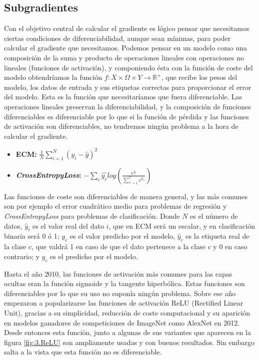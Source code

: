 \subsection{Subgradientes} \label{sec:subgrad}

Con el objetivo central de calcular el gradiente es lógico pensar que necesitamos ciertas condiciones de diferenciabilidad, aunque sean mínimas, para poder calcular el gradiente que necesitamos. Podemos pensar en un modelo como una composición de la suma y producto de operaciones lineales con operaciones no lineales (funciones de activación), y componiendo ésta con la función de coste del modelo obtendríamos la función $f: X \times \Omega \times Y \rightarrow \mathbb{R^+}$, que recibe los pesos del modelo, los datos de entrada y sus etiquetas correctas para proporcionar el error del modelo. Esta es la función que necesitaríamos que fuera diferenciable. Las operaciones lineales preservan la diferenciabilidad, y la composición de funciones diferenciables es diferenciable por lo que si la función de pérdida y las funciones de activación son diferenciables, no tendremos ningún problema a la hora de calcular el gradiente.

\begin{itemize}
    \item \textbf{ECM:} $\frac{1}{N} \sum_{i=1}^N \left (y_i - \hat{y} \right ) ^2$ 

    \item \textbf{\textit{CrossEntropyLoss}:} $  - \sum_c \hat{y_c} log(\frac{e^{y_c}}{\sum_{c'=1}^C e^{y_{c'}}})$
\end{itemize}

Las funciones de coste son diferenciables de manera general, y las más comunes son por ejemplo el error cuadrático medio para problemas de regresión y \textit{CrossEntropyLoss} para problemas de clasificación. Donde $N$ es el número de datos, $\hat{y}_i$ es el valor real del dato $i$, que en ECM será un escalar, y en clasificación binaria será 0 ó 1; $y_c$ es el valor predicho por el modelo, $\hat{y}_{c}$ es la etiqueta real de la clase $c$, que valdrá 1 en caso de que el dato pertenece a la clase $c$ y 0 en caso contrario; y $y_{c}$ es el predicho por el modelo. 


Hasta el año 2010, las funciones de activación más comunes para las capas ocultas eran la función sigmoide y la tangente hiperbólica. Estas funciones son diferenciables por lo que su uso no suponía ningún problema. Sobre ese año empezaron a popularizarse las funciones de activación ReLU (Rectified Linear Unit), gracias a su simplicidad, reducción de coste computacional y su aparición en modelos ganadores de competiciones de ImageNet como AlexNet en 2012. Desde entonces esta función, junto a algunas de sus variantes que aparecen en la figura \ref{fig:3.ReLU} son ampliamente usadas y con buenos resultados. Sin embargo salta a la vista que esta función no es diferenciable.


